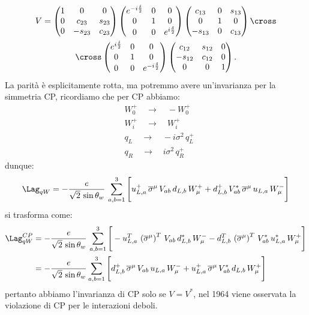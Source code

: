 \begin{multline}
    V = \begin{pmatrix}
        1 & 0 & 0 \\
        0 & c_{23} & s_{23} \\
        0 & -s_{23} & c_{23}
    \end{pmatrix}\begin{pmatrix}
        e^{-i\frac{\delta}{2}} & 0 & 0 \\
        0 & 1 & 0 \\
        0 & 0 & e^{i\frac{\delta}{2}}
    \end{pmatrix}\begin{pmatrix}
        c_{13} & 0 & s_{13} \\
        0 & 1 & 0 \\
        -s_{13} & 0 & c_{13}
    \end{pmatrix}\cross \\
    \cross \begin{pmatrix}
        e^{i\frac{\delta}{2}} & 0 & 0 \\
        0 & 1 & 0 \\
        0 & 0 & e^{-i\frac{\delta}{2}}
    \end{pmatrix}\begin{pmatrix}
        c_{12} & s_{12} & 0 \\
        -s_{12} & c_{12} & 0 \\
        0 & 0 & 1
    \end{pmatrix}.
\end{multline}
La parità è esplicitamente rotta, ma potremmo avere un'invarianza per la simmetria CP, ricordiamo che per CP abbiamo:
\begin{align}
    &W_0^+ \quad \longrightarrow \quad -W_0^+ \\
    &W_i^+ \quad \longrightarrow \quad W_i^+ \\
    &q_L \quad \longrightarrow \quad -i\sigma^2\, q_L^+ \\
    &q_R \quad \longrightarrow \quad i\sigma^2\, q_R^+
\end{align}
dunque:
\begin{equation}
    \Lag_{qW} = -\frac{e}{\sqrt{2}\, \sin{\theta_w}}\, \sum_{a,b=1}^3 \Bigg[ u^+_{L,a}\, \overline{\sigma}^\mu\, V_{ab}\, d_{L,b}\, W_\mu^+ + d_{L,b}^+\, V_{ab}^*\, \overline{\sigma}^\mu\, u_{L,a}\, W_\mu^- \Bigg]
\end{equation}
si trasforma come:
\begin{align}
    \Lag_{qW}^{CP} &= -\frac{e}{\sqrt{2}\, \sin{\theta_w}}\, \sum_{a,b=1}^3 \Bigg[ -u^T_{L,a}\, \left(\overline{\sigma}^\mu\right)^T\, V_{ab}\, d_{L,b}^*\, W_\mu^- - d_{L,b}^T\, \left(\overline{\sigma}^\mu\right)^T\, V_{ab}^*\, u_{L,a}^*\, W_\mu^+ \Bigg] \\
    &= -\frac{e}{\sqrt{2}\, \sin\theta_w}\sum_{a,b=1}^3 \Bigg[ d_{L,b}^+\, \overline{\sigma}^\mu\, V_{ab}\, u_{L,a}\, W_\mu^- + u_{L,a}^+\, \overline{\sigma}^\mu\, V_{ab}^*\, d_{L,b}\, W_\mu^+ \Bigg]
\end{align}
pertanto abbiamo l'invarianza di CP solo se $V=V^*$, nel 1964 viene osservata la violazione di CP per le interazioni deboli.